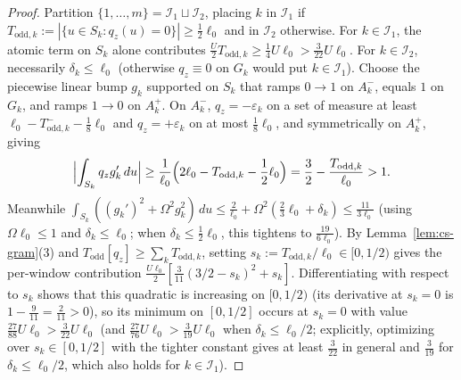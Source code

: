 \documentclass[11pt]{article}
\theoremstyle{definition}
\theoremstyle{remark}
\begin{document}
\begin{proof}
Partition $\{1,\dots,m\} = \mathcal{I}_1 \sqcup \mathcal{I}_2$, placing $k$ in
$\mathcal{I}_1$ if $T_{\mathrm{odd},k} := |\{u \in S_k : q_z(u) = 0\}| \ge \frac{1}{2}\ell_0$
and in $\mathcal{I}_2$ otherwise. For $k \in \mathcal{I}_1$, the atomic term on
$S_k$ alone contributes $\frac{U}{2} T_{\mathrm{odd},k} \ge \frac{1}{4}U\ell_0 > \frac{3}{22}U\ell_0$.
For $k \in \mathcal{I}_2$, necessarily $\delta_k \le \ell_0$ (otherwise $q_z \equiv 0$
on $G_k$ would put $k \in \mathcal{I}_1$). Choose the piecewise linear bump $g_k$
supported on $S_k$ that ramps $0 \to 1$ on $A_k^-$, equals $1$ on $G_k$, and
ramps $1 \to 0$ on $A_k^+$. On $A_k^-$, $q_z = -\varepsilon_k$ on a set of
measure at least $\ell_0 - T_{\mathrm{odd},k}^- - \frac{1}{8}\ell_0$ and
$q_z = +\varepsilon_k$ on at most $\frac{1}{8}\ell_0$, and symmetrically on
$A_k^+$, giving
\[
\Bigl|\int_{S_k} q_z g_k'\,du\Bigr|
\ge \frac{1}{\ell_0}\Bigl(2\ell_0 - T_{\mathrm{odd},k} - \frac{1}{2}\ell_0\Bigr)
= \frac{3}{2} - \frac{T_{\mathrm{odd},k}}{\ell_0} > 1.
\]
Meanwhile $\int_{S_k} ((g_k')^2 + \Omega^2 g_k^2)\,du \le \frac{2}{\ell_0} + \Omega^2 (\frac{2}{3}\ell_0 + \delta_k) \le \frac{11}{3\ell_0}$
(using $\Omega\ell_0 \le 1$ and $\delta_k \le \ell_0$; when $\delta_k \le \frac{1}{2}\ell_0$,
this tightens to $\frac{19}{6\ell_0}$). By Lemma~\ref{lem:cs-gram}(3) and
$T_{\mathrm{odd}}[q_z] \ge \sum_k T_{\mathrm{odd},k}$, setting
$s_k := T_{\mathrm{odd},k}/\ell_0 \in [0, 1/2)$ gives the per-window contribution
$\frac{U\ell_0}{2} [\frac{3}{11}(3/2 - s_k)^2 + s_k]$. Differentiating with respect to
$s_k$ shows that this quadratic is increasing on $[0, 1/2)$ (its derivative at
$s_k = 0$ is $1 - \frac{9}{11} = \frac{2}{11} > 0$), so its minimum on
$[0, 1/2]$ occurs at $s_k = 0$ with value $\frac{27}{88} U\ell_0 > \frac{3}{22} U\ell_0$
(and $\frac{27}{76} U\ell_0 > \frac{3}{19} U\ell_0$ when $\delta_k \le \ell_0/2$;
explicitly, optimizing over $s_k \in [0, 1/2]$ with the tighter constant gives
at least $\frac{3}{22}$ in general and $\frac{3}{19}$ for $\delta_k \le \ell_0/2$,
which also holds for $k \in \mathcal{I}_1$).
\end{proof}
\end{document}
